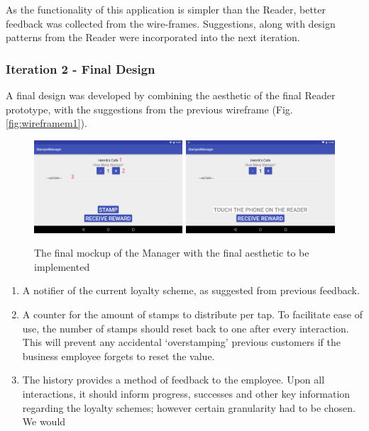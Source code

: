 As the functionality of this application is simpler than the Reader, better feedback was collected from the wire-frames. Suggestions, along with design patterns from the Reader were incorporated into the next iteration.

\subsubsection{Iteration 2 - Final Design}
A final design was developed by combining the aesthetic of the final Reader prototype, with the suggestions from the previous wireframe  (Fig. \ref{fig:wireframem1}).
\begin{figure}[H]
 \centering
  \includegraphics[width=0.494\textwidth]{img/readerfinalmock2.png}
   \includegraphics[width=0.494\textwidth]{img/readerfinalmock1.png}
     \caption{The final mockup of the Manager with the final aesthetic to be implemented}
     \label{fig:wireframem2}
\end{figure}

\begin{enumerate}
  \item A notifier of the current loyalty scheme, as suggested from previous feedback.
  \item A counter for the amount of stamps to distribute per tap. To facilitate ease of use, the number of stamps should reset back to one after every interaction. This will prevent any accidental `overstamping' previous customers if the business employee forgets to reset the value.
  \item The history provides a method of feedback to the employee. Upon all interactions, it should inform progress, successes and other key information regarding the loyalty schemes; however certain granularity had to be chosen. We would 
\end{enumerate}

